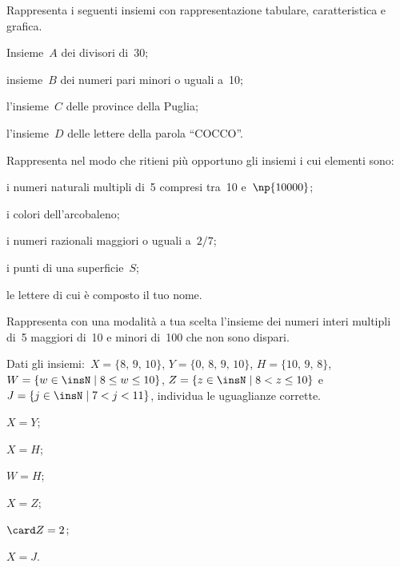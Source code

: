 \begin{esercizio}
Rappresenta i seguenti insiemi con rappresentazione tabulare, caratteristica e grafica.
\begin{enumeratea}
\item Insieme~$A$ dei divisori di~30;
\item insieme~$B$ dei numeri pari minori o uguali a~10;
\item l'insieme~$C$ delle province della Puglia;
\item l'insieme~$D$ delle lettere della parola ``COCCO''.
\end{enumeratea}
\end{esercizio}

\begin{esercizio}
Rappresenta nel modo che ritieni più opportuno gli insiemi i cui elementi sono:
\begin{enumeratea}
\item i numeri naturali multipli di~5 compresi tra~10 e~$\np{10000}$;
\item i colori dell'arcobaleno;
\item i numeri razionali maggiori o uguali a~$2/7$;
\item i punti di una superficie~$S$;
\item le lettere di cui è composto il tuo nome.
\end{enumeratea}
\end{esercizio}

\begin{esercizio}
Rappresenta con una modalità a tua scelta l'insieme dei numeri interi multipli di~5 maggiori di~10 e minori di~100 che non
sono dispari.
\end{esercizio}

\begin{esercizio}
Dati gli insiemi:~$X=\{\text{8, 9, 10}\}$, $Y=\{\text{0, 8, 9, 10}\}$, $H=\{\text{10, 9, 8}\}$,
$W=\{w\in\insN\mid 8\le w\le 10\}$, $Z=\{z\in\insN\mid 8<z\le10\}$ e~$J=\{j\in\insN\mid 7<j<11\}$,
individua le uguaglianze corrette.
\begin{multicols}{3}
\begin{enumeratea}
\item $X = Y$;
\item $X= H$;
\item $W = H$;
\item $X = Z$;
\item $\card Z=2$;
\item $X = J$.
\end{enumeratea}
\end{multicols}
\end{esercizio}

